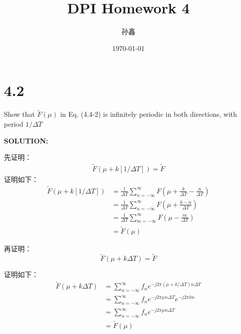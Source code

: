 \documentclass[UTF8,titlepage]{ctexart}
\title{DPI Homework 4}
\author{孙鑫}
\date{\today}
\newcommand{\suminf}{\sum_{n=-\infty}^{\infty}}
\begin{document}
\maketitle
\section*{4.2}
\setlength{\parindent}{0pt}Show that $\tilde{F}(\mu)$ in Eq. (4.4-2) is infinitely periodic in both directions, with period $1/\Delta T$

\textbf{SOLUTION:}

先证明：
\begin{align*}
    \tilde{F}(\mu+k[1/\Delta T])=\tilde{F}
\end{align*}
证明如下：
\begin{align*}
    \tilde{F}(\mu+k[1/\Delta T]) & =\frac{1}{\Delta T}\sum_{n=-\infty}^{\infty}F(\mu+\frac{k}{\Delta T}-\frac{n}{\Delta T})\\
        & = \frac{1}{\Delta T}\sum_{n=-\infty}^{\infty}F(\mu+\frac{k-n}{\Delta T})\\
        & = \frac{1}{\Delta T}\sum_{m=-\infty}^{\infty}F(\mu-\frac{m}{\Delta T})\\
        & = \tilde{F}(\mu)
\end{align*}

再证明：
\begin{displaymath}
    \tilde{F}(\mu+k\Delta T)=\tilde{F}
\end{displaymath}

证明如下：
\begin{align*}
    \tilde{F}(\mu+k\Delta T) &=\suminf f_ne^{-j2\pi(\mu+k/\Delta T)n\Delta T}\\
    &=\suminf f_ne^{-j2\pi\mu n\Delta T}e^{-j2\pi kn}\\
    &=\suminf f_ne^{-j2\pi\mu n\Delta T}\\
    &=\tilde{F}(\mu)
\end{align*}
\end{document}
